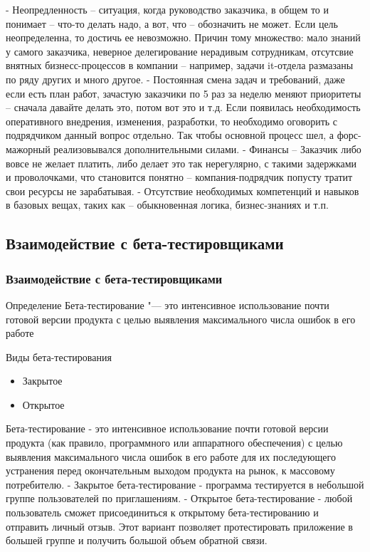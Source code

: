 \documentclass{../industrial-development}
\begin{document}
\lecturenotes
- Неопредленность – ситуация, когда руководство заказчика, в общем то и понимает – что-то делать надо, а вот, что – обозначить не может. Если цель неопределенна, то достичь ее невозможно. Причин тому множество: мало знаний у самого заказчика, неверное делегирование нерадивым сотрудникам, отсутсвие внятных бизнесс-процессов в компании – например, задачи it-отдела размазаны по ряду других и много другое.
- Постоянная смена задач и требований, даже если есть план работ, зачастую заказчики по 5 раз за неделю меняют приоритеты – сначала давайте делать это, потом вот это и т.д. Если появилась необходимость оперативного внедрения, изменения, разработки, то необходимо оговорить с подрядчиком данный вопрос отдельно. Так чтобы основной процесс шел, а форс-мажорный реализовывался дополнительными силами.
- Финансы – Заказчик либо вовсе не желает платить, либо делает это так нерегулярно, с такими задержками и проволочками, что становится понятно – компания-подрядчик попусту тратит свои ресурсы не зарабатывая.
- Отсутствие необходимых компетенций и навыков в базовых вещах, таких как – обыкновенная логика, бизнес-знаниях и т.п. 

\subsection{Взаимодействие с бета-тестировщиками}
\begin{frame} \frametitle{Взаимодействие с бета-тестировщиками}
	\begin{block}{Определение}
		\alert{Бета-тестирование} "--- это интенсивное использование почти готовой версии продукта с целью выявления максимального числа ошибок в его работе
	\end{block}

	\begin{block}{Виды бета-тестирования}
		\begin{itemize}
			\item Закрытое
			\item Открытое
		\end{itemize}
	\end{block}
\end{frame}

\lecturenotes
Бета-тестирование - это интенсивное использование почти готовой версии продукта (как правило, программного или аппаратного обеспечения) с целью выявления максимального числа ошибок в его работе для их последующего устранения перед окончательным выходом продукта на рынок, к массовому потребителю.
- Закрытое бета-тестирование - программа тестируется в небольшой группе пользователей по приглашениям.
- Открытое бета-тестирование - любой пользователь сможет присоединиться к открытому бета-тестированию и отправить личный отзыв. Этот вариант позволяет протестировать приложение в большей группе и получить большой объем обратной связи.
\end{document}
